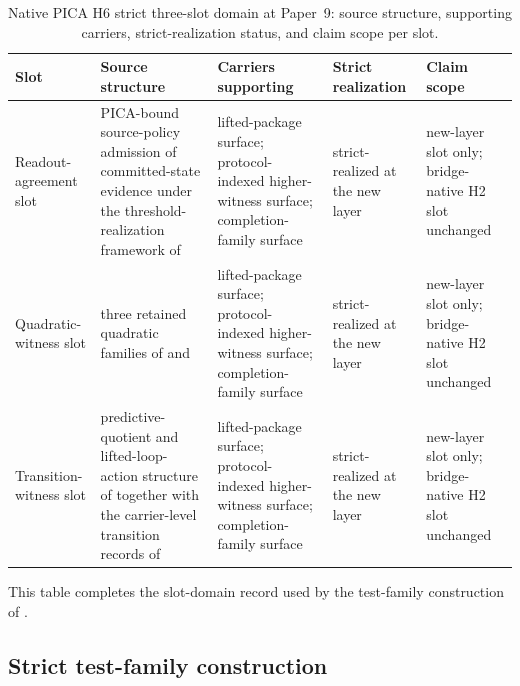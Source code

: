 \documentclass[11pt]{article}
\newcommand{\OldLayer}{H2}
\newcommand{\NewLayer}{H6}
\newcommand{\PaperNine}{Paper~9}
\theoremstyle{definition}
\begin{document}
\begin{table}[tbp]
  \centering
  \caption{Native PICA \NewLayer{} strict three-slot domain at \PaperNine{}: source structure, supporting carriers, strict-realization status, and claim scope per slot.}
  \label{tab:native-strict-domain}
  \small
  \begin{tabularx}{\textwidth}{@{}>{\raggedright\arraybackslash}p{}>{\raggedright\arraybackslash}X>{\raggedright\arraybackslash}p{}>{\raggedright\arraybackslash}p{}>{\raggedright\arraybackslash}p{}@{}}
    \toprule
    Slot & Source structure & Carriers supporting & Strict realization & Claim scope \\
    \midrule
    Readout-agreement slot
      & PICA-bound source-policy admission of committed-state evidence under the threshold-realization framework of \cite{Tsiokos2026FoundationsII}
      & lifted-package surface; protocol-indexed higher-witness surface; completion-family surface
      & strict-realized at the new layer
      & new-layer slot only; bridge-native \OldLayer{} slot unchanged \\
    Quadratic-witness slot
      & three retained quadratic families of \cite{Tsiokos2026InternalStructure} and \cite{Tsiokos2026CarrierExactification}
      & lifted-package surface; protocol-indexed higher-witness surface; completion-family surface
      & strict-realized at the new layer
      & new-layer slot only; bridge-native \OldLayer{} slot unchanged \\
    Transition-witness slot
      & predictive-quotient and lifted-loop-action structure of \cite{Tsiokos2026HolonomyMemory} together with the carrier-level transition records of \cite{Tsiokos2026CarrierExactification}
      & lifted-package surface; protocol-indexed higher-witness surface; completion-family surface
      & strict-realized at the new layer
      & new-layer slot only; bridge-native \OldLayer{} slot unchanged \\
    \bottomrule
  \end{tabularx}
\end{table}
 
This table completes the slot-domain record used by the test-family
construction of .

\subsection{Strict test-family construction}\label{subsec:strict-test-family-construction}
\end{document}
